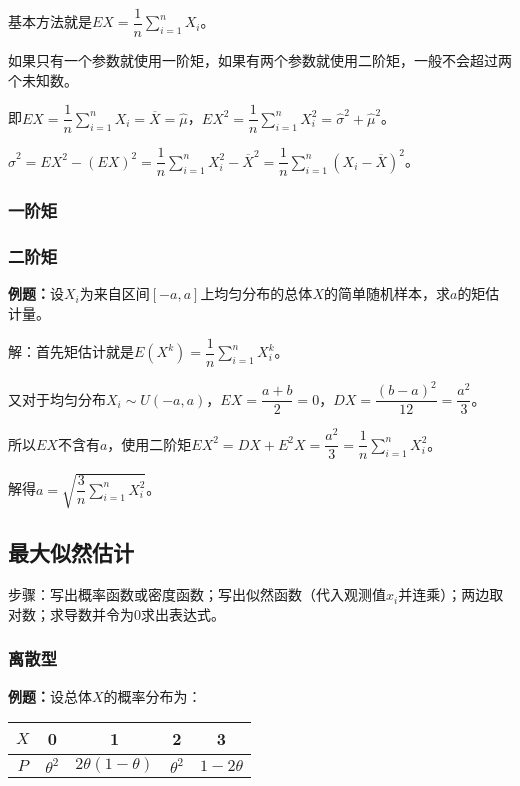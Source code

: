\documentclass[UTF8, 12pt]{ctexart}
\begin{document}
基本方法就是$EX=\dfrac{1}{n}\sum\limits_{i=1}^nX_i$。

如果只有一个参数就使用一阶矩，如果有两个参数就使用二阶矩，一般不会超过两个未知数。

即$EX=\dfrac{1}{n}\sum\limits_{i=1}^nX_i=\overline{X}=\hat{\mu}$，$EX^2=\dfrac{1}{n}\sum\limits_{i=1}^nX_i^2=\hat{\sigma}^2+\hat{\mu}^2$。

$\hat{\sigma}^2=EX^2-(EX)^2=\dfrac{1}{n}\sum\limits_{i=1}^nX_i^2-\overline{X}^2=\dfrac{1}{n}\sum\limits_{i=1}^n(X_i-\overline{X})^2$。

\subsubsection{一阶矩}

\subsubsection{二阶矩}

\textbf{例题：}设$X_i$为来自区间$[-a,a]$上均匀分布的总体$X$的简单随机样本，求$a$的矩估计量。

解：首先矩估计就是$E(X^k)=\dfrac{1}{n}\sum\limits_{i=1}^nX_i^k$。

又对于均匀分布$X_i\sim U(-a,a)$，$EX=\dfrac{a+b}{2}=0$，$DX=\dfrac{(b-a)^2}{12}=\dfrac{a^2}{3}$。

所以$EX$不含有$a$，使用二阶矩$EX^2=DX+E^2X=\dfrac{a^2}{3}=\dfrac{1}{n}\sum\limits_{i=1}^nX_i^2$。

解得$a=\sqrt{\dfrac{3}{n}\sum\limits_{i=1}^nX_i^2}$。

\subsection{最大似然估计}

步骤：写出概率函数或密度函数；写出似然函数（代入观测值$x_i$并连乘）；两边取对数；求导数并令为0求出表达式。

\subsubsection{离散型}

\textbf{例题：}设总体$X$的概率分布为：\medskip

\begin{tabular}{c|cccc}
    \hline
    $X$ & 0 & 1 & 2 & 3 \\ \hline
    $P$ & $\theta^2$ & $2\theta(1-\theta)$ & $\theta^2$ & $1-2\theta$ \\ \hline
\end{tabular} \medskip
\end{document}
